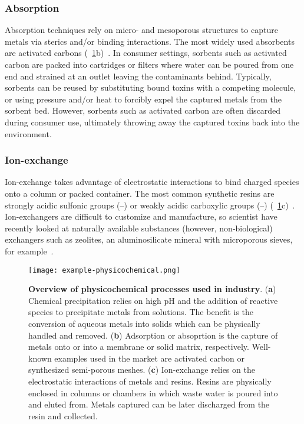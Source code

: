 \documentclass[../main/main]{subfiles}
\begin{document}
\subsubsection*{Absorption}
Absorption techniques rely on micro- and mesoporous structures to capture metals via sterics and/or binding interactions. The most widely used absorbents are activated carbons (\FIGURE~\ref{figure:chapter1:example-physico}b)~\cite{jusoh2007simulation,kang2008sorption}. In consumer settings, sorbents such as activated carbon are packed into cartridges or filters where water can be poured from one end and strained at an outlet leaving the contaminants behind. Typically, sorbents can be reused by substituting bound toxins with a competing molecule, or using pressure and/or heat to forcibly expel the captured metals from the sorbent bed. However, sorbents such as activated carbon are often discarded during consumer use, ultimately throwing away the captured toxins back into the environment.

\subsubsection*{Ion-exchange}
Ion-exchange takes advantage of electrostatic interactions to bind charged species onto a column or packed container. The most common synthetic resins are strongly acidic sulfonic groups (--) or weakly acidic carboxylic groups (--) (\FIGURE~\ref{figure:chapter1:example-physico}c)~\cite{alyuz2009kinetics}. Ion-exchangers are difficult to customize and manufacture, so scientist have recently looked at naturally available substances (however, non-biological) exchangers such as zeolites, an aluminosilicate mineral with microporous sieves, for example~\cite{motsi2009adsorption}.

\begin{figure}[H]
	\centering
	\texttt{[image: example-physicochemical.png]}
	\caption[Overview of physicochemical processes used in industry]
	{
    \textbf{Overview of physicochemical processes used in industry}\protect\footnotemark.
    (\textbf{a}) Chemical precipitation relies on high pH and the addition of reactive species to precipitate metals from solutions. The benefit is the conversion of aqueous metals into solids which can be physically handled and removed.
    (\textbf{b}) Adsorption or absoprtion is the capture of metals onto or into a membrane or solid matrix, respectively. Well-known examples used in the market are activated carbon or synthesized semi-porous meshes.
    (\textbf{c}) Ion-exchange relies on the electrostatic interactions of metals and resins.  Resins are physically enclosed in columns or chambers in which waste water is poured into and eluted from. Metals captured can be later discharged from the resin and collected.
  }
	\label{figure:chapter1:example-physico}
\end{figure}
\end{document}
